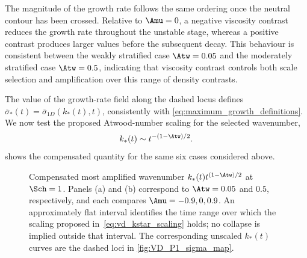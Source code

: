 The magnitude of the growth rate follows the same ordering once the neutral contour has been
crossed. Relative to \(\Amu=0\), a negative viscosity contrast reduces the growth rate throughout
the unstable stage, whereas a positive contrast produces larger values before the subsequent
decay. This behaviour is consistent between the weakly stratified case \(\Atw=0.05\) and the
moderately stratified case \(\Atw=0.5\), indicating that viscosity contrast controls both scale
selection and amplification over this range of density contrasts.

The value of the growth-rate field along the dashed locus defines
\(\overline{\sigma}_\ast(t)=\overline{\sigma}_{1D}(k_\ast(t),t)\), consistently with
\eqref{eq:maximum_growth_definitions}. We now test the proposed Atwood-number scaling for the
selected wavenumber,
\begin{equation}
  k_\ast(t)\sim t^{-(1-\Atw)/2}.
  \label{eq:vd_kstar_scaling}
\end{equation}
 shows the compensated quantity for the same six cases considered
above.

\begin{figure}[p]
  \centering
  \begin{minipage}{0.48\textwidth}
    \centering
  \end{minipage}
  \hfill
  \begin{minipage}{0.48\textwidth}
    \centering
  \end{minipage}
  \caption{Compensated most amplified wavenumber \(k_\ast(t)t^{(1-\Atw)/2}\) at \(\Sch=1\).
  Panels (a) and (b) correspond to \(\Atw=0.05\) and \(0.5\), respectively, and each compares
  \(\Amu=-0.9,0,0.9\). An approximately flat interval identifies the time
  range over which the scaling proposed in~\eqref{eq:vd_kstar_scaling} holds; no collapse is
  implied outside that interval. The corresponding unscaled \(k_\ast(t)\) curves are the dashed
  loci in \cref{fig:VD_P1_sigma_map}.}
  \label{fig:VD_P2_scaling}
\end{figure}
